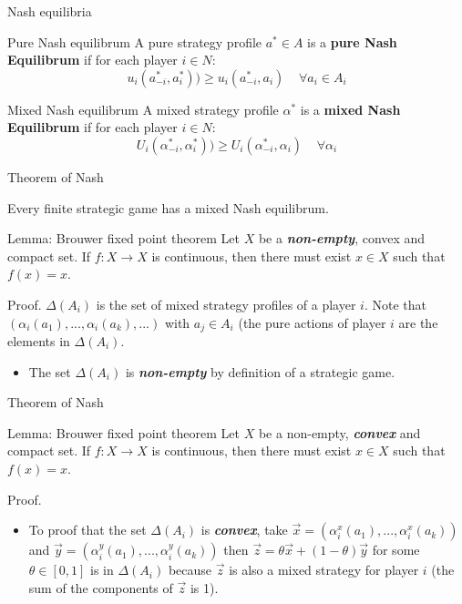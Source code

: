 \documentclass{beamer}
\begin{document}
\begin{frame}{Nash equilibria}
\begin{block}{Pure Nash equilibrum} 
A pure strategy profile $a^* \in A$ is a \textbf{pure Nash Equilibrum} if for each player $i\in N$:
$$u_i(a_{-i}^*,a_i^*)) \geq u_i(a_{-i}^*, a_i) \;\;\;\; \forall a_i \in A_i$$
\end{block}

\begin{block}{Mixed Nash equilibrum}
A mixed strategy profile $\alpha^*$ is a \textbf{mixed Nash Equilibrum} if for each player $i \in N$:
$$U_i(\alpha_{-i}^*,\alpha_i^*)) \geq U_i(\alpha_{-i}^*, \alpha_i) \;\;\;\; \forall \alpha_i$$
\end{block}

\end{frame}


\begin{frame}{Theorem of Nash}
\begin{theorem}
Every finite strategic game has a mixed Nash equilibrum.
\end{theorem}
\begin{block}{Lemma: Brouwer fixed point theorem}
Let $X$ be a \emph{\textbf{non-empty}}, convex and compact set. If $f : X \rightarrow X$ is continuous, then there must exist $x \in X$ such that $f(x) = x$.
\end{block}
\begin{block}{Proof.}
$\Delta(A_i)$ is the set of mixed strategy profiles of a player $i$. Note that $(\alpha_i(a_1),..., \alpha_i(a_k),...)$ with $a_j \in A_i$ (the pure actions of player $i$ are the elements in 
$\Delta(A_i)$. 
\pause
\begin{itemize}
        \item The set $\Delta(A_i)$ is \textbf{\emph{non-empty}} by definition of a strategic game.
\end{itemize}
\end{block}
\end{frame}


\begin{frame}{Theorem of Nash}
\begin{block}{Lemma: Brouwer fixed point theorem}
Let $X$ be a non-empty, \textbf{\emph{convex}} and compact set. If $f : X \rightarrow X$ is continuous, then there must exist $x \in X$ such that $f(x) = x$.
\end{block}
\begin{block}{Proof.}
\begin{itemize}
         \item To proof that the set $\Delta(A_i)$ is \textbf{\emph{convex}}, take $\vec{x} = (\alpha^x_i(a_1),...,\alpha^x_i(a_k))$ and $\vec{y} = (\alpha^y_i(a_1),...,\alpha^y_i(a_k))$ then $\vec{z} = \theta\vec{x} + (1 - \theta)\vec{y}$ for some $\theta \in [0,1]$ is in $\Delta(A_i)$ because $\vec{z}$ is also a mixed strategy for player $i$ (the sum of the components of $\vec{z}$ is 1).
\end{itemize}
\end{block}
\end{frame}
\end{document}
